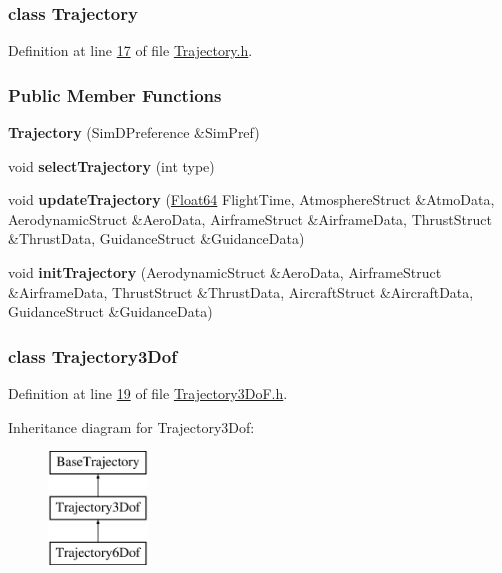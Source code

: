 \subsubsection{class Trajectory}


Definition at line \hyperlink{_trajectory_8h_source_l00017}{17} of file \hyperlink{_trajectory_8h_source}{Trajectory.\+h}.

\subsubsection*{Public Member Functions}
\begin{DoxyCompactItemize}
\item 
{\bfseries Trajectory} (Sim\+D\+Preference \&Sim\+Pref)
\item 
void {\bfseries select\+Trajectory} (int type)
\item 
void {\bfseries update\+Trajectory} (\hyperlink{group___tools_ga3f1431cb9f76da10f59246d1d743dc2c}{Float64} Flight\+Time, Atmosphere\+Struct \&Atmo\+Data, Aerodynamic\+Struct \&Aero\+Data, Airframe\+Struct \&Airframe\+Data, Thrust\+Struct \&Thrust\+Data, Guidance\+Struct \&Guidance\+Data)
\item 
void {\bfseries init\+Trajectory} (Aerodynamic\+Struct \&Aero\+Data, Airframe\+Struct \&Airframe\+Data, Thrust\+Struct \&Thrust\+Data, Aircraft\+Struct \&Aircraft\+Data, Guidance\+Struct \&Guidance\+Data)
\end{DoxyCompactItemize}
\label{class_trajectory3_dof}
\subsubsection{class Trajectory3\+Dof}


Definition at line \hyperlink{_trajectory3_do_f_8h_source_l00019}{19} of file \hyperlink{_trajectory3_do_f_8h_source}{Trajectory3\+Do\+F.\+h}.

Inheritance diagram for Trajectory3\+Dof\+:\begin{figure}[H]
\begin{center}
\leavevmode
\includegraphics[height=3.000000cm]{group___trajectory}
\end{center}
\end{figure}
